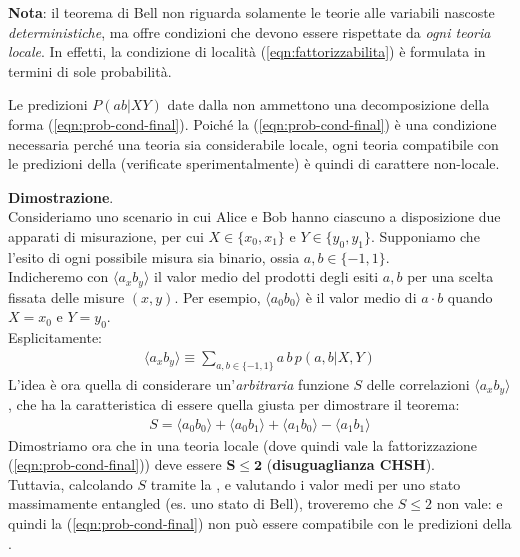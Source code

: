 \documentclass[../../InformazioneQuantistica.tex]{subfiles}
\begin{document}
\textbf{Nota}: il teorema di Bell non riguarda solamente le teorie alle variabili nascoste \textit{deterministiche}, ma offre condizioni che devono essere rispettate da \textit{ogni teoria locale}. In effetti, la condizione di località (\ref{eqn:fattorizzabilita}) è formulata in termini di sole probabilità.

\begin{thm}
Le predizioni $P(ab|XY)$ date dalla \MQ non ammettono una decomposizione della forma (\ref{eqn:prob-cond-final}). Poiché la (\ref{eqn:prob-cond-final}) è una condizione necessaria perché una teoria sia considerabile locale, ogni teoria compatibile con le predizioni della \MQ (verificate sperimentalmente) è quindi di carattere non-locale.
\end{thm}
\textbf{Dimostrazione}.\\
Consideriamo uno scenario in cui Alice e Bob hanno ciascuno a disposizione due apparati di misurazione, per cui $X \in \{x_0, x_1\}$ e $Y\in \{y_0, y_1\}$. Supponiamo che l'esito di ogni possibile misura sia binario, ossia $a, b \in \{-1,1\}$.\\
Indicheremo con $\langle a_x b_y \rangle$ il valor medio del prodotti degli esiti $a, b$ per una scelta fissata delle misure $(x,y)$. Per esempio, $\langle a_0 b_0\rangle$ è il valor medio di $a \cdot b$ quando $X=x_0$ e $Y=y_0$.\\
Esplicitamente:
\begin{align}
\langle a_x b_y\rangle \equiv \sum_{a,b\in\{-1,1\}} a\,b\,p(a,b|X,Y)
\label{eqn:correlatore}
\end{align}
L'idea è ora quella di considerare un'\textit{arbitraria} funzione $S$ delle correlazioni $\langle a_x b_y \rangle$, che ha la caratteristica di essere quella giusta per dimostrare il teorema:
\begin{align}
S= \langle a_0 b_0 \rangle + \langle a_0 b_1\rangle + \langle a_1 b_0 \rangle - \langle a_1 b_1 \rangle 
\label{eqn:S-Bell}
\end{align}
Dimostriamo ora che in una teoria locale (dove quindi vale la fattorizzazione (\ref{eqn:prob-cond-final})) deve essere $\bm{S\leq 2}$ (\textbf{disuguaglianza CHSH}).\\
Tuttavia, calcolando $S$ tramite la \MQ, e valutando i valor medi per uno stato massimamente entangled (es. uno stato di Bell), troveremo che $S \leq 2$ non vale: e quindi la (\ref{eqn:prob-cond-final}) non può essere compatibile con le predizioni della \MQ.\\
\end{document}
